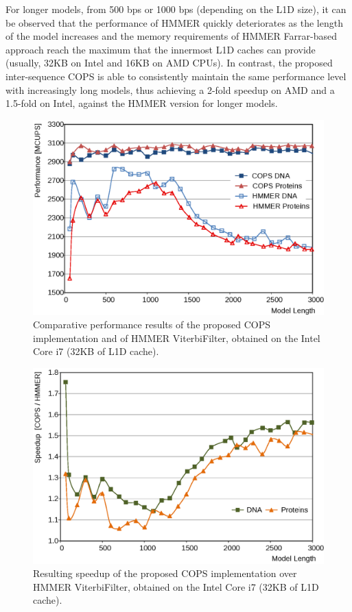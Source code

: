 \documentclass{bmcart}
\begin{document}
For longer models, from 500 bps or 1000 bps (depending on the \ac{L1D} size), it can be observed that the performance of HMMER quickly deteriorates as the length of the model increases and the memory requirements of HMMER Farrar-based approach reach the maximum that the innermost \ac{L1D} caches can provide (usually, 32KB on Intel and 16KB on AMD CPUs). In contrast, the proposed inter-sequence COPS is able to consistently maintain the same performance level with increasingly long models, thus achieving a 2-fold speedup on AMD and a 1.5-fold on Intel, against the HMMER version for longer models.

\begin{figure}[!b]
  \centering
  \includegraphics[width=12cm]{img/Intel-Perf.eps}
  \caption{Comparative performance results of the proposed COPS implementation and of HMMER ViterbiFilter, obtained on the Intel Core i7 (32KB of L1D cache).}
  \label{runtimes-liliana}
\end{figure}

\begin{figure}[!b]
  \centering
  \includegraphics[width=12cm]{img/Intel-speedup.eps}
  \caption{Resulting speedup of the proposed COPS implementation over HMMER ViterbiFilter, obtained on the Intel Core i7 (32KB of L1D cache).}
  \label{speedups-liliana}  
\end{figure}
\end{document}
